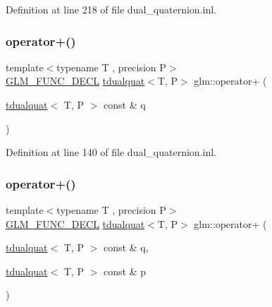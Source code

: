 Definition at line 218 of file dual\+\_\+quaternion.\+inl.

\mbox{\label{group__gtx__dual__quaternion_gaf14cf93205560472618c9f93a52a2e1f}} 
\subsubsection{\texorpdfstring{operator+()}{operator+()}\hspace{0.1cm}{\footnotesize\ttfamily [1/2]}}
{\footnotesize\ttfamily template$<$typename T , precision P$>$ \\
\mbox{\hyperlink{setup_8hpp_ab2d052de21a70539923e9bcbf6e83a51}{G\+L\+M\+\_\+\+F\+U\+N\+C\+\_\+\+D\+E\+CL}} \mbox{\hyperlink{structglm_1_1tdualquat}{tdualquat}}$<$T, P$>$ glm\+::operator+ (\begin{DoxyParamCaption}\item[{\mbox{\hyperlink{structglm_1_1tdualquat}{tdualquat}}$<$ T, P $>$ const \&}]{q }\end{DoxyParamCaption})}



Definition at line 140 of file dual\+\_\+quaternion.\+inl.

\mbox{\label{group__gtx__dual__quaternion_ga9d7cfca38c6ff90757705600da3c7972}} 
\subsubsection{\texorpdfstring{operator+()}{operator+()}\hspace{0.1cm}{\footnotesize\ttfamily [2/2]}}
{\footnotesize\ttfamily template$<$typename T , precision P$>$ \\
\mbox{\hyperlink{setup_8hpp_ab2d052de21a70539923e9bcbf6e83a51}{G\+L\+M\+\_\+\+F\+U\+N\+C\+\_\+\+D\+E\+CL}} \mbox{\hyperlink{structglm_1_1tdualquat}{tdualquat}}$<$T, P$>$ glm\+::operator+ (\begin{DoxyParamCaption}\item[{\mbox{\hyperlink{structglm_1_1tdualquat}{tdualquat}}$<$ T, P $>$ const \&}]{q,  }\item[{\mbox{\hyperlink{structglm_1_1tdualquat}{tdualquat}}$<$ T, P $>$ const \&}]{p }\end{DoxyParamCaption})}



